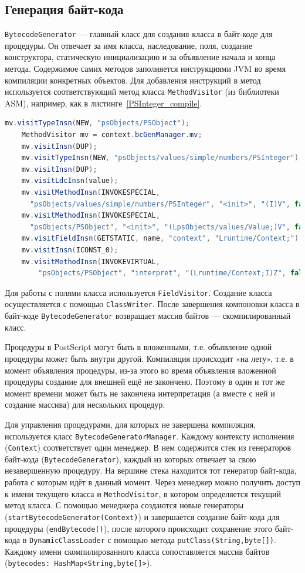 \documentclass[14pt]{extarticle}
\begin{document}
	\subsection{Генерация байт-кода}
	\texttt{BytecodeGenerator}  --- главный класс для создания класса в байт-коде для процедуры. Он отвечает за имя класса, наследование, поля, создание конструктора, статическую инициализацию и за объявление начала и конца метода. Содержимое самих методов заполняется инструкциями JVM во время компиляции конкретных объектов. Для добавления инструкций в метод используется соответствующий метод класса \texttt{MethodVisitor} (из библиотеки ASM), например, как в листинге~\ref{PSInteger_compile}. 
	\begin{lstlisting}[label=PSInteger_compile,caption=Компиляция объектов \texttt{Integer} ,captionpos=b, frame = single,language = Java]     mv.visitTypeInsn(NEW, "psObjects/PSObject");
	MethodVisitor mv = context.bcGenManager.mv;
	mv.visitInsn(DUP);
	mv.visitTypeInsn(NEW, "psObjects/values/simple/numbers/PSInteger");
	mv.visitInsn(DUP);
	mv.visitLdcInsn(value);
	mv.visitMethodInsn(INVOKESPECIAL, 
	  "psObjects/values/simple/numbers/PSInteger", "<init>", "(I)V", false);
	mv.visitMethodInsn(INVOKESPECIAL,
	  "psObjects/PSObject", "<init>", "(LpsObjects/values/Value;)V", false);		
	mv.visitFieldInsn(GETSTATIC, name, "context", "Lruntime/Context;");
	mv.visitInsn(ICONST_0);
	mv.visitMethodInsn(INVOKEVIRTUAL,
		"psObjects/PSObject", "interpret", "(Lruntime/Context;I)Z", false);
	\end{lstlisting}
	Для работы с полями класса используется \texttt{FieldVisitor}. Создание класса осуществляется с помощью \texttt{ClassWriter}. После завершения компоновки класса в байт-коде \texttt{BytecodeGenerator}	возвращает массив байтов --- скомпилированный класс.
	
	Процедуры в PostScript могут быть в вложенными, т.е. объявление одной процедуры может быть внутри другой. Компиляция происходит «на лету», т.е. в момент объявления процедуры, из-за этого во время объявления вложенной процедуры создание для внешней ещё не закончено. Поэтому в один и тот же момент времени может быть не закончена интерпретация (а вместе с ней и создание массива) для нескольких процедур.
	
	Для управления процедурами, для которых не завершена компиляция, используется класс \texttt{BytecodeGeneratorManager}. Каждому контексту исполнения (\texttt{Context}) соответствует один менеджер. В нем содержится стек из генераторов байт-кода (\texttt{BytecodeGenerator}), каждый из которых отвечает за свою незавершенную процедуру. На вершине стека находится тот генератор байт-кода, работа с которым идёт в данный момент. Через менеджер можно получить доступ к имени текущего класса и \texttt{MethodVisitor}, в котором определяется текущий метод класса. С помощью менеджера создаются новые генераторы (\texttt{startBytecodeGenerator(Context)}) и завершается создание  байт-кода для процедуры (\texttt{endBytecode()}), после которого происходит сохранение этого байт-кода в \texttt{DynamicClassLoader} с помощью метода \texttt{putClass(String,byte[])}. Каждому имени скомпилированного класса сопоставляется массив байтов (\texttt{bytecodes: HashMap<String,byte[]>}).
	
\end{document}
